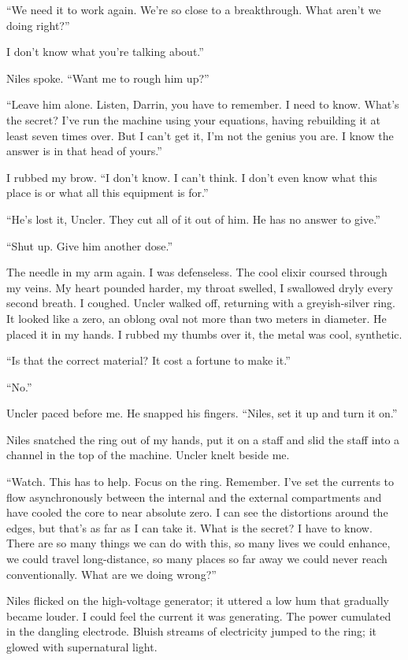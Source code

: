 ``We need it to work again. We're so close to a breakthrough. What
aren't we doing right?''

I don't know what you're talking about.''

Niles spoke. ``Want me to rough him up?''

``Leave him alone. Listen, Darrin, you have to remember. I need to know.
What's the secret? I've run the machine using your equations, having
rebuilding it at least seven times over. But I can't get it, I'm not the
genius you are. I know the answer is in that head of yours.''

I rubbed my brow. ``I don't know. I can't think. I don't even know what
this place is or what all this equipment is for.''

``He's lost it, Uncler. They cut all of it out of him. He has no answer
to give.''

``Shut up. Give him another dose.''

The needle in my arm again. I was defenseless. The cool elixir coursed
through my veins. My heart pounded harder, my throat swelled, I
swallowed dryly every second breath. I coughed. Uncler walked off,
returning with a greyish-silver ring. It looked like a zero, an oblong
oval not more than two meters in diameter. He placed it in my hands. I
rubbed my thumbs over it, the metal was cool, synthetic.

``Is that the correct material? It cost a fortune to make it.''

``No.''

Uncler paced before me. He snapped his fingers. ``Niles, set it up and
turn it on.''

Niles snatched the ring out of my hands, put it on a staff and slid the
staff into a channel in the top of the machine. Uncler knelt beside me.

``Watch. This has to help. Focus on the ring. Remember. I've set the
currents to flow asynchronously between the internal and the external
compartments and have cooled the core to near absolute zero. I can see
the distortions around the edges, but that's as far as I can take it.
What is the secret? I have to know. There are so many things we can do
with this, so many lives we could enhance, we could travel
long-distance, so many places so far away we could never reach
conventionally. What are we doing wrong?''

Niles flicked on the high-voltage generator; it uttered a low hum that
gradually became louder. I could feel the current it was generating. The
power cumulated in the dangling electrode. Bluish streams of electricity
jumped to the ring; it glowed with supernatural light.

